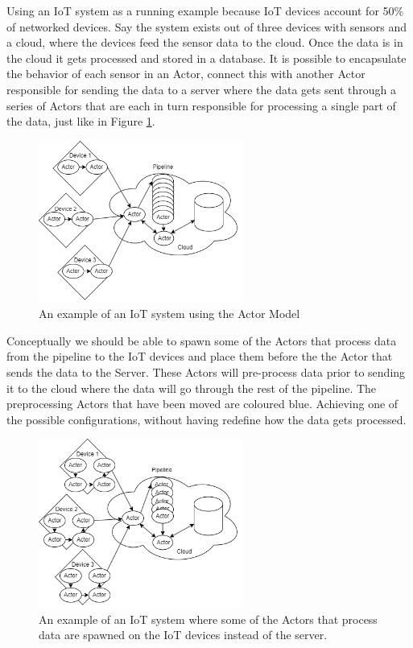 \documentclass[a4paper]{article}
\begin{document}
Using an IoT system as a running example because IoT devices account for 50\% of networked devices\cite{differentnetworkneedsiot}. Say the system exists out of three devices with sensors and a cloud, where the devices feed the sensor data to the cloud. Once the data is in the cloud it gets processed and stored in a database. It is possible to encapsulate the behavior of each sensor in an Actor, connect this with another Actor responsible for sending the data to a server where the data gets sent through a series of Actors that are each in turn responsible for processing a single part of the data, just like in Figure \ref{fig:iotActorExample1}.
\begin{figure}[H]
    \centering
    \includegraphics[width=0.6\textwidth]{iotActorExample1.png}
    \caption{An example of an IoT system using the Actor Model}
    \label{fig:iotActorExample1}
\end{figure}
Conceptually we should be able to spawn some of the Actors that process data from the pipeline to the IoT devices and place them before the the Actor that sends the data to the Server. These Actors will pre-process data prior to sending it to the cloud where the data will go through the rest of the pipeline. The preprocessing Actors that have been moved are coloured blue. Achieving one of the possible configurations, without having redefine how the data gets processed.
\begin{figure}[H]
    \centering
    \includegraphics[width=0.6\textwidth]{iotActorsMoved.png}
    \caption{An example of an IoT system where some of the Actors that process data are spawned on the IoT devices instead of the server.}
    \label{fig:iotActorExample2}
\end{figure}
\end{document}
